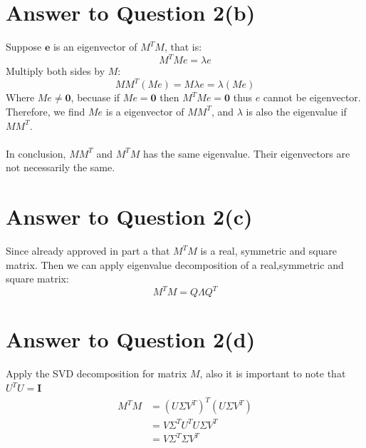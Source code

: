 \documentclass[11pt]{article}
\begin{document}
\section*{Answer to Question 2(b)}
Suppose $\mathbf{e}$ is an eigenvector of $M^TM$, that is:
\begin{equation*}
    M^TMe = \lambda e
\end{equation*}
Multiply both sides by $M$:
\begin{equation*}
    MM^T(Me) = M\lambda e = \lambda (Me)
\end{equation*}
Where $Me \neq \mathbf{0}$, becuase if $Me = \mathbf{0}$ then $M^TMe = \mathbf{0}$ thus $e$ cannot be eigenvector.
Therefore, we find $Me$ is a eigenvector of $MM^T$, and $\lambda$ is also the eigenvalue if $MM^T$.\\
\\
In conclusion, $MM^T$ and $M^TM$ has the same eigenvalue. Their eigenvectors are not necessarily the same.

\pagebreak[4]
\section*{Answer to Question 2(c)}
Since already approved in part a that $M^TM$ is a real, symmetric and square matrix.
Then we can apply eigenvalue decomposition of a real,symmetric and square matrix:
\begin{equation}
    M^TM = Q\Lambda Q^T
\end{equation}

\pagebreak[4]
\section*{Answer to Question 2(d)}
Apply the SVD decomposition for matrix $M$, also it is important to note that $U^TU = \mathbf{I}$
\begin{equation}
\begin{aligned}
    M^TM & = (U\Sigma V^T)^T(U\Sigma V^T)\\
    & = V\Sigma^TU^TU\Sigma V^T\\
    & = V\Sigma^T\Sigma V^T
\end{aligned}
\end{equation}

\pagebreak[4]
\end{document}
